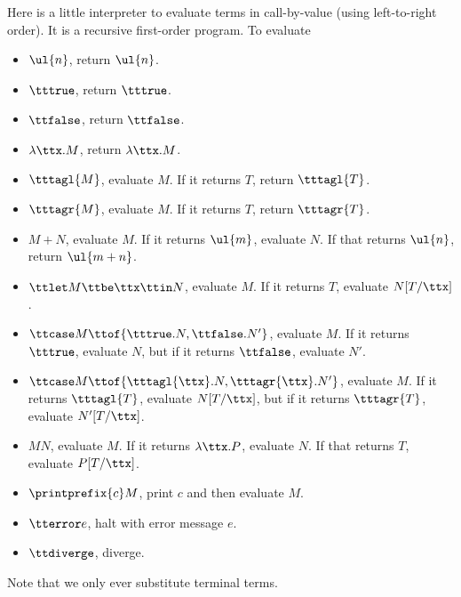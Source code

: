 \documentclass[runningheads,12pt]{llncs}
\begin{document}
Here is a little interpreter to evaluate terms in call-by-value (using left-to-right order). It is a recursive first-order program.  To evaluate 
\begin{itemize}
\item  $\ul{n}$, return $\ul{n}$.
\item $\tttrue$, return $\tttrue$.
\item $\ttfalse$, return $\ttfalse$.
\item $\lambda \ttx. M$, return $\lambda \ttx. M$.
\item $\tttagl{M}$, evaluate $M$.  If it returns $T$, return $\tttagl{T}$.
\item $\tttagr{M}$, evaluate $M$.  If it returns $T$, return $\tttagr{T}$.
\item $M+N$, evaluate $M$.  If it returns $\ul{m}$, evaluate $N$.  If that returns $\ul{n}$, return $\ul{m+n}$.
\item $\ttlet M \ttbe \ttx \ttin N$, evaluate $M$.  If it returns $T$, evaluate $N[T/\ttx]$.
\item $\ttcase M \ttof \{ \tttrue. N, \ttfalse. N' \}$, evaluate $M$.  If it returns $\tttrue$, evaluate $N$, but if it returns $\ttfalse$, evaluate $N'$.
\item $\ttcase M \ttof \{ \tttagl{\ttx}. N, \tttagr{\ttx}. N' \}$, evaluate $M$.  If it returns $\tttagl{T}$, evaluate $N[T/\ttx]$, but if it returns $\tttagr{T}$, evaluate $N'[T/\ttx]$.
\item $MN$, evaluate $M$.  If it returns $\lambda \ttx. P$, evaluate $N$.  If that returns $T$, evaluate $P[T/\ttx]$.
\item $\printprefix{c}M$, print $c$ and then evaluate $M$.
\item $\tterror e$, halt with error message $e$.
\item $\ttdiverge$, diverge.
\end{itemize}
Note that we only ever substitute terminal terms.
\end{document}

